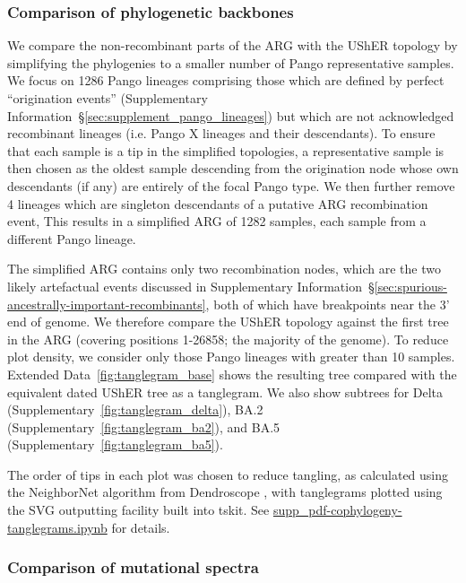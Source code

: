\documentclass[12pt]{article}
\newcommand{\supref}[1]{Supplementary Information~\S\ref{#1}}
\newcommand{\edref}[1]{Extended Data~\ref{#1}}
\newcommand{\siref}[1]{Supplementary~\ref{#1}}
\begin{document}
\subsubsection*{Comparison of phylogenetic backbones}
We compare the non-recombinant parts of the ARG with the UShER topology
by simplifying the phylogenies to a smaller number of
Pango representative samples.
We focus on 1286 Pango lineages comprising those which are defined by perfect ``origination events''
(\supref{sec:supplement_pango_lineages})
but which are not acknowledged recombinant lineages (i.e. Pango X lineages and their descendants).
To ensure that each sample is a tip in the simplified topologies,
a representative sample is then chosen as the oldest sample
descending from the origination node
whose own descendants (if any) are entirely of the focal Pango type.
We then further remove 4 lineages
which are singleton descendants of a putative ARG recombination event,
This results in a simplified ARG of 1282 samples,
each sample from a different Pango lineage.

The simplified ARG contains only two recombination nodes, which
are the two likely artefactual events discussed in
\supref{sec:spurious-ancestrally-important-recombinants},
both of which have breakpoints near the 3' end of genome.
We therefore compare the UShER topology against the first tree in the ARG (covering
positions 1-26858; the majority of the genome). To reduce plot density, we consider
only those Pango lineages with greater than 10 samples.
\edref{fig:tanglegram_base} shows the resulting tree compared with
the equivalent dated UShER tree as a tanglegram.
We also show subtrees for Delta (\siref{fig:tanglegram_delta}),
BA.2 (\siref{fig:tanglegram_ba2}),
and BA.5 (\siref{fig:tanglegram_ba5}).

The order of tips in each plot was chosen to reduce tangling,
as calculated using the NeighborNet algorithm from
Dendroscope \cite{Scornavacca2011,Huson2012},
with tanglegrams plotted using the SVG outputting facility built into tskit.
See \href{https://github.com/jeromekelleher/sc2ts-paper/blob/main/notebooks/supp\_pdf-cophylogeny-tanglegrams.ipynb}{supp\_pdf-cophylogeny-tanglegrams.ipynb}
for details.

\subsubsection*{Comparison of mutational spectra}
\end{document}
